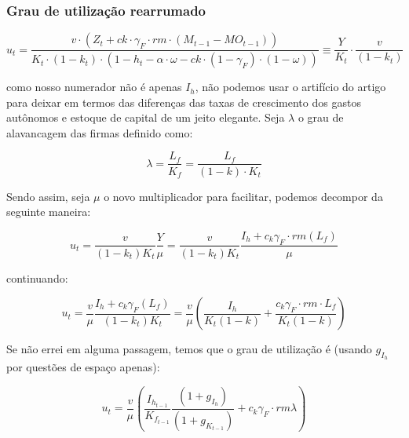 \documentclass[11pt]{article}
\begin{document}
\subsubsection*{Grau de utilização rearrumado}
\label{sec:orgbd9e21d}

\begin{latex}
\begin{equation}
u_{t} = \frac{v \cdot \left(Z_t + ck \cdot \gamma_{F} \cdot rm \cdot \left(M_{t-1} - MO_{t-1}\right)\right)}{K_t \cdot \left(1-k_{t}\right) \cdot \left(1 - h_t - \alpha \cdot \omega - ck \cdot \left(1 - \gamma_{F}\right) \cdot \left(1 - \omega\right)\right)} \equiv \frac{Y}{K_{t}}\cdot\frac{v}{(1-k_{t})}
\end{equation}
\end{latex}
como nosso numerador não é apenas \(I_{h}\), não podemos usar o artifício do artigo para deixar em termos das diferenças das taxas de crescimento dos gastos autônomos e estoque de capital de um jeito elegante.
Seja \(\lambda\) o grau de alavancagem das firmas definido como:
\begin{latex}
\begin{equation}
\lambda = \frac{L_{f}}{K_{f}} = \frac{L_{f}}{(1-k)\cdot K_{t}}
\end{equation}
\end{latex}

Sendo assim, seja \(\mu\) o novo multiplicador para facilitar, podemos decompor da seguinte maneira:
\begin{latex}
\begin{equation}
u_{t} = \frac{v}{(1-k_{t})K_{t}}\frac{Y}{\mu} = \frac{v}{(1-k_{t})K_{t}}\frac{I_{h} + c_{k}\gamma_{F}\cdot rm (L_{f})}{\mu}
\end{equation}
\end{latex}
continuando:
\begin{latex}
\begin{equation}
u_{t} = \frac{v}{\mu}\frac{I_{h} + c_{k}\gamma_{F}(L_{f})}{(1-k_{t})K_{t}} = \frac{v}{\mu}\left(\frac{I_{h}}{K_{t}(1-k)} + \frac{c_{k}\gamma_{F}\cdot rm \cdot L_{f}}{K_{t}(1-k)}\right)
\end{equation}
\end{latex}

Se não errei em alguma passagem, temos que o grau de utilização é (usando \(g_{I_{h}}\) por questões de espaço apenas):
\begin{latex}
\begin{equation}
u_{t} =  \frac{v}{\mu}\left(\frac{I_{h_{t-1}}}{K_{f_{t-1}}}\frac{(1+g_{I_{h}})}{(1+g_{K_{t-1}})} + c_{k}\gamma_{F}\cdot rm \lambda\right)
\end{equation}
\end{latex}
\end{document}
